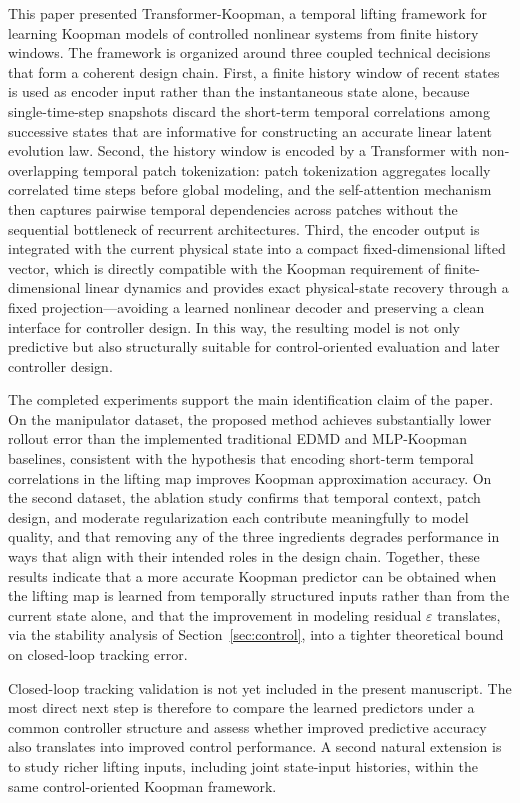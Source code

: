 \documentclass[journal]{IEEEtran}
\begin{document}
This paper presented Transformer-Koopman, a temporal lifting framework for learning Koopman models of controlled nonlinear systems from finite history windows. The framework is organized around three coupled technical decisions that form a coherent design chain. First, a finite history window of recent states is used as encoder input rather than the instantaneous state alone, because single-time-step snapshots discard the short-term temporal correlations among successive states that are informative for constructing an accurate linear latent evolution law. Second, the history window is encoded by a Transformer with non-overlapping temporal patch tokenization: patch tokenization aggregates locally correlated time steps before global modeling, and the self-attention mechanism then captures pairwise temporal dependencies across patches without the sequential bottleneck of recurrent architectures. Third, the encoder output is integrated with the current physical state into a compact fixed-dimensional lifted vector, which is directly compatible with the Koopman requirement of finite-dimensional linear dynamics and provides exact physical-state recovery through a fixed projection---avoiding a learned nonlinear decoder and preserving a clean interface for controller design. In this way, the resulting model is not only predictive but also structurally suitable for control-oriented evaluation and later controller design.

The completed experiments support the main identification claim of the paper. On the manipulator dataset, the proposed method achieves substantially lower rollout error than the implemented traditional EDMD and MLP-Koopman baselines, consistent with the hypothesis that encoding short-term temporal correlations in the lifting map improves Koopman approximation accuracy. On the second dataset, the ablation study confirms that temporal context, patch design, and moderate regularization each contribute meaningfully to model quality, and that removing any of the three ingredients degrades performance in ways that align with their intended roles in the design chain. Together, these results indicate that a more accurate Koopman predictor can be obtained when the lifting map is learned from temporally structured inputs rather than from the current state alone, and that the improvement in modeling residual $\varepsilon$ translates, via the stability analysis of Section~\ref{sec:control}, into a tighter theoretical bound on closed-loop tracking error.

Closed-loop tracking validation is not yet included in the present manuscript. The most direct next step is therefore to compare the learned predictors under a common controller structure and assess whether improved predictive accuracy also translates into improved control performance. A second natural extension is to study richer lifting inputs, including joint state-input histories, within the same control-oriented Koopman framework.
\end{document}

